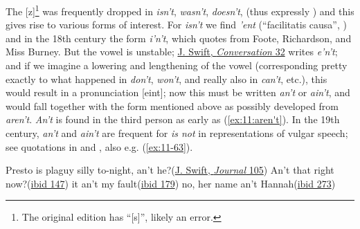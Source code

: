 The [z]\footnote{The original edition has ``[s]'', likely an error. \eds}
was frequently dropped in \textit{isn't}, \textit{wasn't}, \textit{doesn't}, (thus expressly \cite[\href{https://archive.org/details/bim_eighteenth-century_the-principles-of-the-en_elphinston-james_1765_1/page/134/mode/2up?view=theater&q=sink}{1.134}]{elphinston1765principles}) %
and this gives rise to various forms of interest. For \textit{isn't} we find \textit{'ent} (``facilitatis causa'', \cite[79]{cooper1685grammatica}) and in the 18th century the form \textit{i'n't}, which \citet[236]{hall1873modern} %
quotes from Foote, Richardson, and Miss Burney. But the vowel is unstable; \href{https://archive.org/details/cu31924013200898/page/n67/mode/2up?q=%22following+Book%22&view=theater}{J. Swift, \textit{Conversation} 32} writes \textit{e'n't}; and if we imagine a lowering and lengthening of the vowel (corresponding pretty exactly to what happened in \textit{don't}, \textit{won't}, and really also in \textit{can't}, etc.), this would result in a pronunciation [eint]; 
now this must be written \textit{an't} or \textit{ain't}, and would fall together with the form mentioned above as possibly developed from 
\textit{aren't}. \textit{An't} is found in the third person as early as (\ref{ex:11:aren't}). In the 19th century, \textit{an't} and \textit{ain't} are frequent for \textit{is not} in representations of vulgar speech; see quotations in \citet[\href{https://archive.org/details/p2englischephilo01storuoft/page/708/mode/2up?view=theater}{709}]{storm1896englische} and \citet[\href{https://archive.org/details/slangitsanalogue01farm/page/50/mode/2up?view=theater}{50}]{farmer1909slang}, also e.g. (\ref{ex:11-63}).

\ea \label{ex:11:aren't}
\ea Presto is plaguy silly to-night, an't he?\hfill(\href{https://archive.org/details/journaltostellae00swifuoft/page/104/mode/2up?q=%22Presto+is+plaguy%22&view=theater}{J. Swift, \textit{Journal} 105})
\ex An't that right now?\hfill(\href{https://archive.org/details/journaltostellae00swifuoft/page/146/mode/2up?q=%22An%27t+that+right%22&view=theater}{ibid 147})
\ex it an't my fault\hfill(\href{https://archive.org/details/journaltostellae00swifuoft/page/178/mode/2up?q=%22an%27t+my+fault%22&view=theater}{ibid 179})
\ex no, her name an't Hannah\hfill(\href{https://archive.org/details/journaltostellae00swifuoft/page/272/mode/2up?q=%22an%27t+Hannah%22&view=theater}{ibid 273}) %
\z
\z

